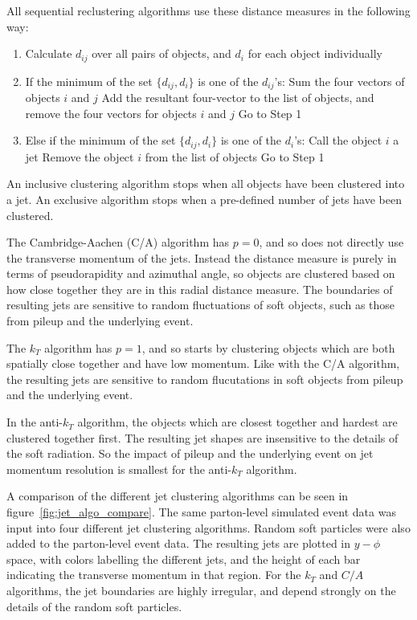 All sequential reclustering algorithms use these distance measures in the following way:

\begin{enumerate}
    \item Calculate $d_{ij}$ over all pairs of objects, and $d_i$ for each object individually
    \item If the minimum of the set $\{d_{ij}, d_i\}$ is one of the $d_{ij}$'s:
        \subitem Sum the four vectors of objects $i$ and $j$
        \subitem Add the resultant four-vector to the list of objects, and remove the four vectors for objects $i$ and $j$
        \subitem Go to Step 1
    \item Else if the minimum of the set $\{d_{ij}, d_i\}$ is one of the $d_i$'s:
        \subitem Call the object $i$ a jet
        \subitem Remove the object $i$ from the list of objects
        \subitem Go to Step 1
\end{enumerate}

An inclusive clustering algorithm stops when all objects have been clustered into a jet.
An exclusive algorithm stops when a pre-defined number of jets have been clustered.\cite{jet-algo-review}

The Cambridge-Aachen (C/A) algorithm has $p=0$, and so does not directly use the transverse momentum of the jets.
Instead the distance measure is purely in terms of pseudorapidity and azimuthal angle,
so objects are clustered based on how close together they are in this radial distance measure.
The boundaries of resulting jets are sensitive to random fluctuations of soft objects,
such as those from pileup and the underlying event.

The $k_T$ algorithm has $p=1$, and so starts by clustering objects which are both spatially close together and have low momentum.
Like with the C/A algorithm, the resulting jets are sensitive to random flucutations in soft objects from pileup and the underlying event.

In the anti-$k_T$ algorithm, the objects which are closest together and hardest are clustered together first.
The resulting jet shapes are insensitive to the details of the soft radiation.
So the impact of pileup and the underlying event on jet momentum resolution is smallest for the anti-$k_T$ algorithm\cite{jet-antikt-algo}.

A comparison of the different jet clustering algorithms can be seen in figure~\ref{fig:jet_algo_compare}.
The same parton-level simulated event data was input into four different jet clustering algorithms.
Random soft particles were also added to the parton-level event data.
The resulting jets are plotted in $y-\phi$ space, with colors labelling the different jets, and the height of each bar
indicating the transverse momentum in that region.
For the $k_T$ and $C/A$ algorithms, the jet boundaries are highly irregular, and depend strongly on the details of the random soft particles.\cite{jet-antikt-algo}


